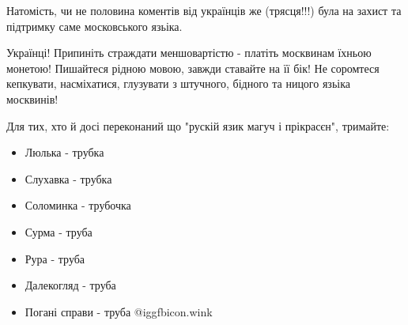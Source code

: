 Натомість, чи не половина коментів від українців же (трясця!!!) була на захист
та підтримку саме московського язьіка.

Українці! Припиніть страждати меншовартістю - платіть москвинам їхньою монетою!
Пишайтеся рідною мовою, завжди ставайте на її бік! Не соромтеся кепкувати,
насміхатися, глузувати з штучного, бідного та ницого язьіка москвинів!

Для тих, хто й досі переконаний що "рускій язик магуч і прікрасєн", тримайте:

\begin{itemize}
  \item Люлька        - трубка
  \item Слухавка      - трубка
  \item Соломинка     - трубочка
  \item Сурма         - труба
  \item Рура          - труба
  \item Далекогляд    - труба
  \item Погані справи - труба  @igg{fbicon.wink} 
\end{itemize}


